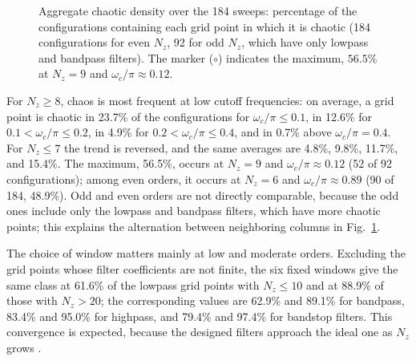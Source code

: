 \documentclass[journal]{IEEEtran}
\begin{document}
\begin{figure}[!t]
\centering

\caption{Aggregate chaotic density over the 184 sweeps: percentage of the
configurations containing each grid point in which it is chaotic (184
configurations for even $N_z$, 92 for odd $N_z$, which have only lowpass and
bandpass filters). The marker ($\circ$) indicates the maximum, $56.5\%$ at
$N_z=9$ and $\omega_c/\pi\approx0.12$.}
\label{fig:density}
\end{figure}

For $N_z\ge8$, chaos is most frequent at low cutoff frequencies: on average, a
grid point is chaotic in 23.7\% of the configurations for $\omega_c/\pi\le0.1$,
in 12.6\% for $0.1<\omega_c/\pi\le0.2$, in 4.9\% for
$0.2<\omega_c/\pi\le0.4$, and in 0.7\% above $\omega_c/\pi=0.4$. For
$N_z\le7$ the trend is reversed, and the same averages are 4.8\%, 9.8\%,
11.7\%, and 15.4\%. The maximum, 56.5\%, occurs at $N_z=9$ and
$\omega_c/\pi\approx0.12$ (52 of 92 configurations); among even orders, it
occurs at $N_z=6$ and $\omega_c/\pi\approx0.89$ (90 of 184, 48.9\%). Odd and
even orders are not directly comparable, because the odd ones include only the
lowpass and bandpass filters, which have more chaotic points; this explains the
alternation between neighboring columns in Fig.~\ref{fig:density}.

The choice of window matters mainly at low and moderate orders. Excluding the
grid points whose filter coefficients are not finite, the six fixed windows
give the same class at 61.6\% of the lowpass grid points with $N_z\le10$ and at
88.9\% of those with $N_z>20$; the corresponding values are 62.9\% and 89.1\%
for bandpass, 83.4\% and 95.0\% for highpass, and 79.4\% and 97.4\% for
bandstop filters. This convergence is expected, because the designed filters
approach the ideal one as $N_z$ grows \cite{Oppenheim2009}.

\end{document}
